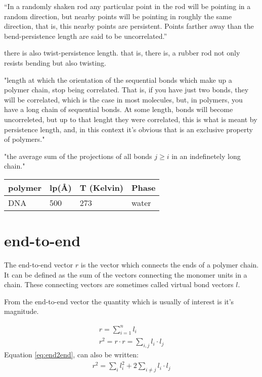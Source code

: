 ``In a randomly shaken rod any particular point in the rod will be
pointing in a random direction, but nearby points will be pointing in
roughly the same direction, that is, this nearby points are
persistent. Points farther away than the bend-persistence length are
said to be uncorrelated.''

there is also twist-persistence length.
that is, there is, a rubber rod not only resists bending but also twisting.

"length at which the orientation of the sequential bonds which make
up a polymer chain, stop being correlated. That is, if you have just
two bonds, they will be correlated, which is the case in most
molecules, but, in polymers, you have a long chain of sequential
bonds. At some length, bonds will become uncorreleted, but up to that
lenght they were correlated, this is what is meant by persistence
length, and, in this context it's obvious that is an exclusive
property of polymers."

"the average sum of the projections of all bonds $ j \geq i$  in an 
indefinetely long chain."


\begin{table}[htbp]
\begin{center}
\begin{tabular}{|l|l|l|l|}
\hline 
polymer & lp(\AA) & T (Kelvin) & Phase \\ \hline
DNA     & 500     &  273       & water \\ \hline
\end{tabular}
\end{center}
\end{table}



\section{end-to-end}
The end-to-end vector  $r$ is the vector which connects  the ends of a 
polymer chain.  It  can be defined  as the sum  of the vectors connecting the
monomer units in a chain. These connecting vectors are sometimes called
virtual  bond vectors $l$.  

From  the end-to-end  vector  the quantity
which is usually of interest is it's magnitude.

\begin{gather}
\label{eq:end2end}
r = \sum_{i=1}^{n} l_{i}\\
r^2 = r \cdot r = \sum_{i,j}l_{i} \cdot l_{j}
\end{gather}
Equation \ref{eq:end2end}, can also be written:
\begin{gather}
r^2 = \sum_{i}l_{i}^{2} + 2 \sum_{i\neq j} l_{i} \cdot l_{j}
\end{gather}  

